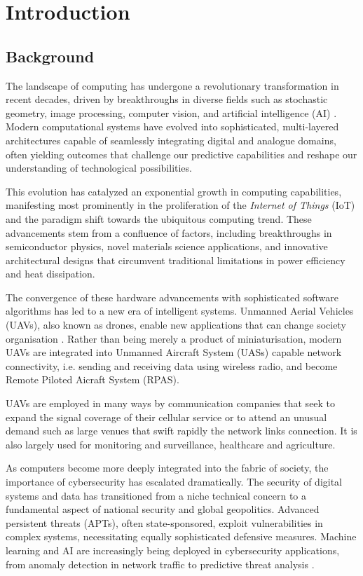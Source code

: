 \chapter{Introduction}
\label{cap:intr}

\section{Background}
The landscape of computing has undergone a revolutionary transformation in recent decades, driven by breakthroughs in diverse fields such as stochastic geometry, image processing, computer vision, and artificial intelligence (AI) \cite{Zhao2020}. Modern computational systems have evolved into sophisticated, multi-layered architectures capable of seamlessly integrating digital and analogue domains, often yielding outcomes that challenge our predictive capabilities and reshape our understanding of technological possibilities.

This evolution has catalyzed an exponential growth in computing capabilities, manifesting most prominently in the proliferation of the \textit{Internet of Things} (IoT) and the paradigm shift towards the ubiquitous computing trend. These advancements stem from a confluence of factors, including breakthroughs in semiconductor physics, novel materials science applications, and innovative architectural designs that circumvent traditional limitations in power efficiency and heat dissipation.

The convergence of these hardware advancements with sophisticated software algorithms has led to a new era of intelligent systems. Unmanned Aerial Vehicles (UAVs), also known as drones, enable new applications that can change society organisation \cite{Sharma.2020}. Rather than being merely a product of miniaturisation, modern UAVs are integrated into Unmanned Aircraft System (UASs) capable network connectivity, i.e. sending and receiving data using wireless radio, and become Remote Piloted Aicraft System (RPAS).
 
UAVs are employed in many ways by communication companies that seek to expand the signal coverage of their cellular service or to attend an unusual demand such as large venues that swift rapidly the network links connection. It is also largely used for monitoring and surveillance, healthcare and agriculture. 

As computers become more deeply integrated into the fabric of society, the importance of cybersecurity has escalated dramatically. The security of digital systems and data has transitioned from a niche technical concern to a fundamental aspect of national security and global geopolitics. Advanced persistent threats (APTs), often state-sponsored, exploit vulnerabilities in complex systems, necessitating equally sophisticated defensive measures. Machine learning and AI are increasingly being deployed in cybersecurity applications, from anomaly detection in network traffic to predictive threat analysis \cite{Liu2016}.

